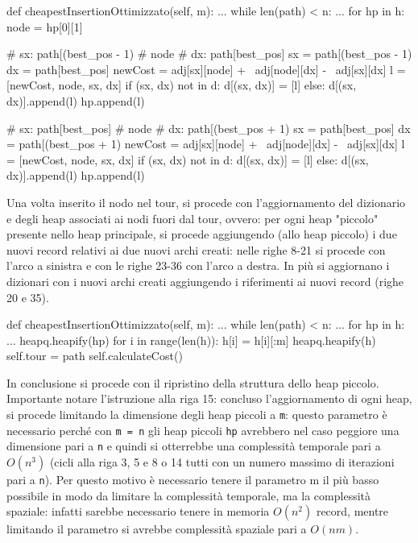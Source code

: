 \documentclass[a4paper,12pt]{report}
\begin{document}
\begin{python}
def cheapestInsertionOttimizzato(self, m):
  ...
  while len(path) < n:
    ...
    for hp in h:
      node = hp[0][1]

      # sx: path[(best_pos - 1) %
      # node
      # dx: path[best_pos]
      sx = path[(best_pos - 1) %
      dx = path[best_pos]
      newCost = adj[sx][node] + \
                adj[node][dx] - \
                adj[sx][dx]
      l = [newCost, node, sx, dx]
      if (sx, dx) not in d:
          d[(sx, dx)] = [l]
      else:
        d[(sx, dx)].append(l)
      hp.append(l)

      # sx: path[best_pos]
      # node
      # dx: path[(best_pos + 1) %
      sx = path[best_pos]
      dx = path[(best_pos + 1) %
      newCost = adj[sx][node] + \
                adj[node][dx] - \
                adj[sx][dx]
      l = [newCost, node, sx, dx]
      if (sx, dx) not in d:
        d[(sx, dx)] = [l]
      else:
        d[(sx, dx)].append(l)
      hp.append(l)
\end{python}
Una volta inserito il nodo nel tour, si procede con l'aggiornamento del dizionario e degli heap associati ai nodi fuori dal tour, ovvero: per ogni heap "piccolo" presente nello heap principale, si procede aggiungendo (allo heap piccolo) i due nuovi record relativi ai due nuovi archi creati: nelle righe 8-21 si procede con l'arco a sinistra e con le righe 23-36 con l'arco a destra. In più si aggiornano i dizionari con i nuovi archi creati aggiungendo i riferimenti ai nuovi record (righe 20 e 35).
\begin{python}
def cheapestInsertionOttimizzato(self, m):
  ...
  while len(path) < n:
    ...
    for hp in h:
      ...
      heapq.heapify(hp)
    for i in range(len(h)):
      h[i] = h[i][:m]
    heapq.heapify(h)
  self.tour = path
  self.calculateCost()
\end{python}
In conclusione si procede con il ripristino della struttura dello heap piccolo. \newline Importante notare l'istruzione alla riga 15: concluso l'aggiornamento di ogni heap, si procede limitando la dimensione degli heap piccoli a \lstinline!m!: questo parametro è necessario perché con \lstinline|m = n| gli heap piccoli \lstinline|hp| avrebbero nel caso peggiore una dimensione pari a \lstinline|n| e quindi si otterrebbe una complessità temporale pari a $O(n^3)$ (cicli alla riga 3, 5 e 8 o 14 tutti con un numero massimo di iterazioni pari a \lstinline|n|). Per questo motivo è necessario tenere il parametro m il più basso possibile in modo da limitare la complessità temporale, ma la complessità spaziale: infatti sarebbe necessario tenere in memoria $O(n^2)$ record, mentre limitando il parametro si avrebbe complessità spaziale pari a $O(nm)$. \newline
\end{document}
